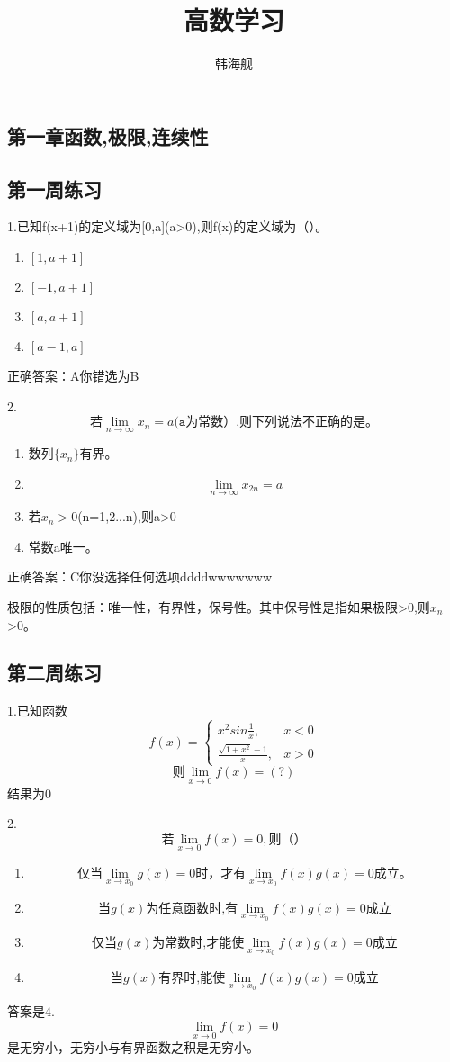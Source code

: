 \documentclass[fleqn]{article}
\begin{document}
\title{高数学习}
\author{韩海舰}
\maketitle
\setlength{\mathindent}{10pt}
\begin{flushleft}
\section{第一章\quad 函数,极限,连续性}
\subsection{第一周练习}
1.已知f(x+1)的定义域为[0,a](a>0),则f(x)的定义域为（）。
\begin{enumerate}
\item $[1,a+1]$
\item $[-1,a+1]$
\item $[a,a+1]$
\item $[a-1,a]$
\end{enumerate}

正确答案：A你错选为B

2. \[\texttt{若}\lim_{n\to \infty}x_n=a\texttt{(a为常数）,则下列说法不正确的是。}\]
\begin{enumerate}
\item 数列$\{x_n\}$有界。
\item \[\lim_{n\to \infty}x_{2n}=a\]
\item 若$x_n>0$(n=1,2...n),则a>0
\item 常数a唯一。
\end{enumerate}
正确答案：C你没选择任何选项ddddwwwwwww

极限的性质包括：唯一性，有界性，保号性。其中保号性是指如果极限>0,则$x_n$>0。
\subsection{第二周练习}
\par
1.已知函数\[
f(x)=\left\{\begin{array}{ll}
x^2sin\frac{1}{x} ,& x<0 \\
\frac{\sqrt{1+x^2}-1}{x}, & x>0
\end{array}
\right. 
\]
\[\texttt{则}\lim_{x\to 0}f(x)=(?)
\]
结果为0
\par
2.\[
\texttt{若}\lim_{x\to 0}f(x)=0,\texttt{则（）}\]
\begin{enumerate}
\item \[\texttt{仅当}\lim_{x\to x_0}g(x)=0\texttt{时，才有}\lim_{x\to x_0}f(x)g(x)=0\texttt{成立。}\]
\item \[\texttt{当}g(x)\texttt{为任意函数时,有}\lim_{x\to x_0}f(x)g(x)=0\texttt{成立}\]
\item \[\texttt{仅当}g(x)\texttt{为常数时,才能使}\lim_{x\to x_0}f(x)g(x)=0\texttt{成立}\]
\item \[\texttt{当}g(x)\texttt{有界时,能使}\lim_{x\to x_0}f(x)g(x)=0\texttt{成立}\]
\end{enumerate}
答案是4.\[\lim_{x\to 0}f(x)=0\]是无穷小，无穷小与有界函数之积是无穷小。


\end{flushleft}
\end{document}
